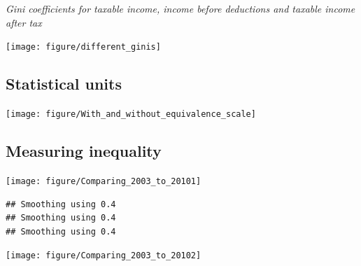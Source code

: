 \documentclass[twoside]{article}\usepackage[]{graphicx}\usepackage[]{color}
\makeatletter
\newenvironment{kframe}{%
 \def\at@end@of@kframe{}%
 \ifinner\ifhmode%
  \def\at@end@of@kframe{\end{minipage}}%
  \begin{minipage}{\columnwidth}%
 \fi\fi%
 \def\FrameCommand##1{\hskip\@totalleftmargin \hskip-\fboxsep
 \colorbox{shadecolor}{##1}\hskip-\fboxsep
     \hskip-\linewidth \hskip-\@totalleftmargin \hskip\columnwidth}%
 \MakeFramed {\advance\hsize-\width
   \@totalleftmargin\z@ \linewidth\hsize
   \@setminipage}}%
 {\par\unskip\endMakeFramed%
 \at@end@of@kframe}
\newenvironment{knitrout}{}{} %
\makeatother
\begin{document}
\begin{multicols}{2}
\emph{Gini coefficients for taxable income, income before deductions and taxable income after tax}



\begin{knitrout}
\color{fgcolor}
\texttt{[image: figure/different\_ginis]} 

\end{knitrout}

\subsection{Statistical units}






\begin{knitrout}
\color{fgcolor}
\texttt{[image: figure/With\_and\_without\_equivalence\_scale]} 

\end{knitrout}

\subsection{Measuring inequality}






\begin{knitrout}
\color{fgcolor}
\texttt{[image: figure/Comparing\_2003\_to\_20101]} 
\begin{kframe}\begin{verbatim}
## Smoothing using 0.4
## Smoothing using 0.4
## Smoothing using 0.4
\end{verbatim}
\end{kframe}
\texttt{[image: figure/Comparing\_2003\_to\_20102]} 

\end{knitrout}



\end{multicols}
\end{document}
